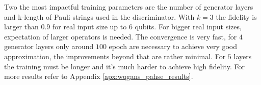 Two the most impactful training parameters are the number of
generator layers and k-length of Pauli strings used in the discriminator. With
$k=3$ the fidelity is larger than $0.9$ for real input size up to $6$ qubits.
For bigger real input sizes, expectation of larger operators is needed. The convergence is
very fast, for $4$ generator layers only around $100$ epoch are necessary to
achieve very good approximation, the improvements beyond that are rather
minimal. For $5$ layers the training must be longer and it's much harder to
achieve high fidelity. For more results refer to Appendix \ref{apx:wqgans_pahse_results}.



\begin{figure}[htbp!]
  \captionsetup[subfigure]{labelformat=empty}
  \centering


\end{figure}
